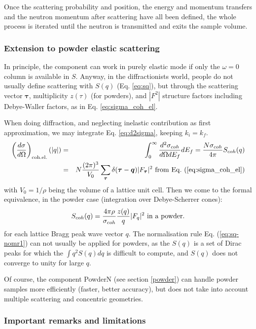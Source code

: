 Once the scattering probability and position, the energy and momentum transfers and the neutron momentum after scattering have all been defined, the whole process is iterated until the neutron is transmitted and exits the sample volume.

\subsubsection{Extension to powder elastic scattering}

In principle, the component can work in purely elastic mode if only the $\omega = 0$ column is available in $S$.
Anyway, in the diffractionists world, people do not usually define scattering with $S(q)$ (Eq. \ref{eq:sq}), but through the scattering vector $\boldsymbol{\tau}$, multiplicity $z(\tau)$ (for powders), and $|F^2|$ structure factors including Debye-Waller factors, as in Eq. \ref{eq:sigma_coh_el}.

When doing diffraction, and neglecting inelastic contribution as first approximation, we may integrate Eq. \ref{eq:d2sigma}, keeping $k_i = k_f$.
\begin{eqnarray}
\left(\frac{d\sigma}{d\Omega}\right)_{\rm coh.el.}(|q|) &=& \int_0^\infty \frac{d^2\sigma_{coh}}{d\Omega dE_f} dE_f = \frac{N \sigma_{coh}}{4\pi} S_{coh}(q) \\
& = & N\frac{(2\pi)^3}{V_0}\sum_{\boldsymbol{\tau}} \delta(\boldsymbol{\tau} - \boldsymbol{q})|F_{\boldsymbol{\tau}}|^2 {\rm\ from\ Eq.\ (\ref{eq:sigma_coh_el})}
\end{eqnarray}
with $V_0 = 1/\rho$ being the volume of a lattice unit cell. Then we come to the formal equivalence, in the powder case \cite{squires} (integration over Debye-Scherrer cones):
\begin{eqnarray}\label{eq:sq-F2}
S_{coh}(q) = \frac{4 \pi \rho}{\sigma_{coh}} \frac{z(q)}{q} |F_q|^2 {\rm\ in\ a\ powder.}
\end{eqnarray}
for each lattice Bragg peak wave vector $q$.
The normalisation rule Eq. (\ref{eq:sq-nomr1}) can not usually be applied for powders, as the $S(q)$ is a set of Dirac peaks for which the $\int q^2 S(q) dq$ is difficult to compute, and $S(q)$ does not converge to unity for large $q$.

Of course, the component PowderN (see section \ref{powder}) can handle powder samples more efficiently (faster, better accuracy), but does not take into account multiple scattering and concentric geometries.

\subsubsection{Important remarks and limitations}

